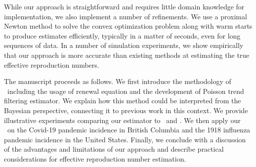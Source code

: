While our approach is straightforward and requires little domain knowledge for
implementation, we also implement a number of refinements. 
% 
We use a proximal Newton method to solve the convex optimization problem along
with warm starts to produce estimates efficiently,
typically in a matter of seconds, even for long sequences of data.
In a number of simulation experiments, we show empirically that our approach is
more accurate than existing methods at estimating the true effective reproduction numbers. 


The manuscript proceeds as follows. We first introduce the methodology of
\RtEstim\ including the usage of renewal equation and the development of Poisson
trend filtering estimator. We explain how this method could be interpreted from
the Bayesian perspective, connecting it to previous work in this context. We
provide illustrative experiments comparing our estimator to \EpiEstim\ and
\EpiLPS. We then apply our \RtEstim\ on the Covid-19 pandemic incidence in
British Columbia and the 1918 influenza pandemic incidence in the United States. Finally,
we conclude with a discussion of the advantages and limitations of our approach
and describe practical considerations for effective reproduction number
estimation.
